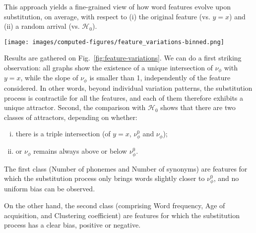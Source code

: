This approach yields a fine-grained view of how word features evolve upon substitution, on average, with respect to (i) the original feature (\hbox{vs.} $y=x$) and (ii) a random arrival (\hbox{vs.} $\mathcal{H}_0$).
\begin{figure*}[!th]
    \centering
    \texttt{[image: images/computed-figures/feature\_variations-binned.png]}
    \caption{\textbf{Feature variation upon substitution:} average feature value of the appearing word as a function of the feature value of the disappearing word in a substitution, with 95\% asymptotic confidence intervals.
    The overall position of the curve with respect to the dashed line representing $\mathcal{H}_0$ (constant $\nu_{\phi}^0$) indicates the direction of the cognitive bias.
    }
    \label{fig:feature-variations}
\end{figure*}

\medskip
Results are gathered on Fig.~\ref{fig:feature-variations}.
We can do a first striking observation: all graphs show the existence of a unique intersection of $\nu_{\phi}$ with $y=x$, while the slope of $\nu_{\phi}$ is smaller than 1, independently of the feature considered.
In other words, beyond individual variation patterns, the substitution process is contractile for all the features, and each of them therefore exhibits a unique attractor.
Second, the comparison with $\mathcal{H}_0$ shows that there are two classes of attractors, depending on whether:
\begin{enumerate}[(i)] 
\item there is a triple intersection (of $y=x$, $\nu_{\phi}^0$ and $\nu_{\phi}$);
\item or $\nu_{\phi}$ remains always above or below $\nu_{\phi}^0$.
\end{enumerate}
The first class (Number of phonemes and Number of synonyms) are features for which the substitution process only brings words slightly closer to $\nu_{\phi}^0$, and no uniform bias can be observed.

On the other hand, the second class (comprising Word frequency, Age of acquisition, and Clustering coefficient) are features for which the substitution process has a clear bias, positive or negative.

